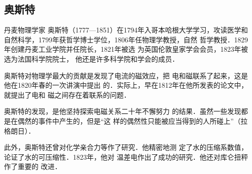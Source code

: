 \subsection{奥斯特}
丹麦物理学家
奥斯特（1777—1851）在1794年入哥本哈根大学学习，攻读医学和自然科学，1799年获哲学博士学位，1806年任物理学教授，自然
哲学教授．1829年创建丹麦工业学院并任院长，1821年被选
为英国伦敦皇家学会会员，1823年被选为法国科学院院士，
他还是许多科学院和学会的成员．

奥斯特对物理学最大的贡献是发现了电流的磁效应，把
电和磁联系了起来，这是他在1820年春的一次讲演中提出
的．实际上，早在1812年在他所发表的论文中，就提出了电和
磁之间存在着联系的问题．

奥斯特的发现，是他坚持探索电磁关系二十年不懈努力
的结果．虽然一些发现都是在偶然的事件中产生的，但是“这
样的偶然性只能被应当得到的人所碰上”（拉格朗日）．

此外，奥斯特还曾对化学亲合力等作了研究．他精密地测
定了水的压缩系数值，论证了水的可压缩性．1823年，他对
温差电作出了成功的研究．他还对库仑扭秤作了重要的
改进．